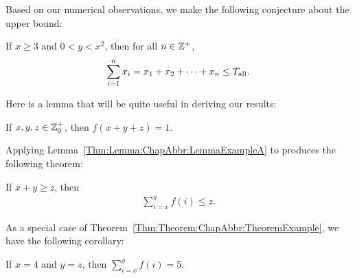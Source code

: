 Based on our numerical observations, we make the following conjecture about the upper bound:

\begin{Thm:Conjecture}
If \mbox{$x\geq 3$} and \mbox{$0<y<x^2$}, then for all \mbox{$n\in{\mathbb{Z}}^+$},
\[
\sum_{i=1}^{n} x_i
= x_1 + x_2 + \cdots + x_n
\leq T_{\textup{all}}.
\]
\end{Thm:Conjecture}

Here is a lemma that will be quite useful in deriving our results:

\begin{Thm:Lemma}
\label{Thm:Lemma:ChapAbbr:LemmaExampleA}
If \mbox{$x,y,z\in{\mathbb{Z}}^+_0$}, then \mbox{$f(x+y+z) = 1$}.
\end{Thm:Lemma}

Applying Lemma~\ref{Thm:Lemma:ChapAbbr:LemmaExampleA} to \cite[Theorem~4.2]{IEEEexample:book_typical} produces the following theorem:

\begin{Thm:Theorem}
\label{Thm:Theorem:ChapAbbr:TheoremExample}
If \mbox{$x+y\geq z$}, then
\begin{align}
\sum_{i=x}^{y} f(i) \leq z.
\end{align}
\end{Thm:Theorem}

As a special case of Theorem~\ref{Thm:Theorem:ChapAbbr:TheoremExample}, we have the following corollary:

\begin{Thm:Corollary}
If \mbox{$x=4$} and \mbox{$y=z$}, then \mbox{$\sum_{i=x}^{y} f(i) = 5$}.
\end{Thm:Corollary}

\lipsum[13]


